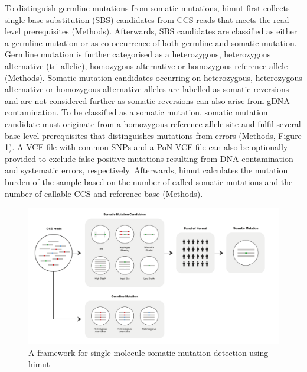 To distinguish germline mutations from somatic mutations, himut first collects single-base-substitution (SBS) candidates from CCS reads that meets the read-level prerequisites (Methods). Afterwards, SBS candidates are classified as either a germline mutation or as co-occurrence of both germline and somatic mutation. Germline mutation is further categorised as a heterozygous, heterozygous alternative (tri-allelic), homozygous alternative or homozygous reference allele (Methods). Somatic mutation candidates occurring on heterozygous, heterozygous alternative or homozygous alternative alleles are labelled as somatic reversions and are not considered further as somatic reversions can also arise from gDNA contamination. To be classified as a somatic mutation, somatic mutation candidate must originate from a homozygous reference allele site and fulfil several base-level prerequisites that distinguishes mutations from errors (Methods, Figure \ref{figure:somatic-mutation-detection}). A VCF file with common SNPs and a PoN VCF file can also be optionally provided to exclude false positive mutations resulting from DNA contamination and systematic errors, respectively. Afterwards, himut calculates the mutation burden of the sample based on the number of called somatic mutations and the number of callable CCS and reference base (Methods). 

\begin{figure}[htbp!]
\caption{A framework for single molecule somatic mutation detection using himut}
\label{figure:somatic-mutation-detection}
\begin{centering}
\includegraphics[width=\textwidth]{Vector/himut.pdf}
\end{centering}
\end{figure}

